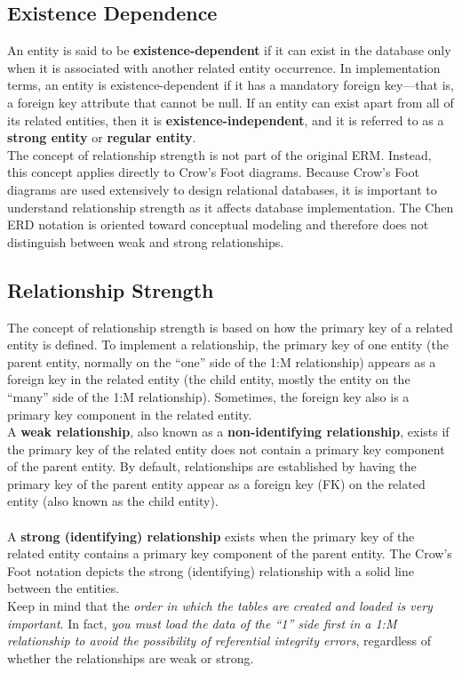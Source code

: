 \documentclass[a4paper, 12pt, titlepage]{report}
\begin{document}
{\subsection{Existence Dependence}
An entity is said to be \textbf{existence-dependent} if it can exist in the database only when it is associated with another related entity occurrence. In implementation terms, an entity is existence-dependent if it has a mandatory foreign key—that is, a foreign key attribute that cannot be null. If an entity can exist apart from all of its related entities, then it is \textbf{existence-independent}, and it is referred to as a \textbf{strong entity} or \textbf{regular entity}. \\The concept of relationship strength is not part of the original ERM. Instead, this concept applies directly to Crow’s Foot diagrams. Because Crow’s Foot diagrams are used extensively to design relational databases, it is important to understand relationship strength as it affects database implementation. The Chen ERD notation is oriented toward conceptual modeling and therefore does not distinguish between weak and strong relationships.
\subsection{Relationship Strength}
The concept of relationship strength is based on how the primary key of a related entity is defined. To implement a relationship, the primary key of one entity (the parent entity,
normally on the “one” side of the 1:M relationship) appears as a foreign key in the related entity (the child entity, mostly the entity on the “many” side of the 1:M relationship). Sometimes, the foreign key also is a primary key component in the related entity.\\
A \textbf{weak relationship}, also known as a \textbf{non-identifying relationship}, exists if the primary key of the related entity does not contain a primary key component of the parent entity. By default, relationships are established by having the primary key of the parent entity appear as a foreign key (FK) on the related entity (also known as the child entity).\\ \\
A \textbf{strong (identifying) relationship} exists when the primary key of the related entity contains a primary key component of the parent entity. The Crow’s Foot notation depicts the strong (identifying) relationship with a solid line between the entities.\\
Keep in mind that the \emph{order in which the tables are created and loaded is very important}. In fact, \emph{you must load the data of the “1” side first in a 1:M relationship to avoid the possibility of referential integrity errors}, regardless of whether the relationships are weak or strong.
}
\end{document}
